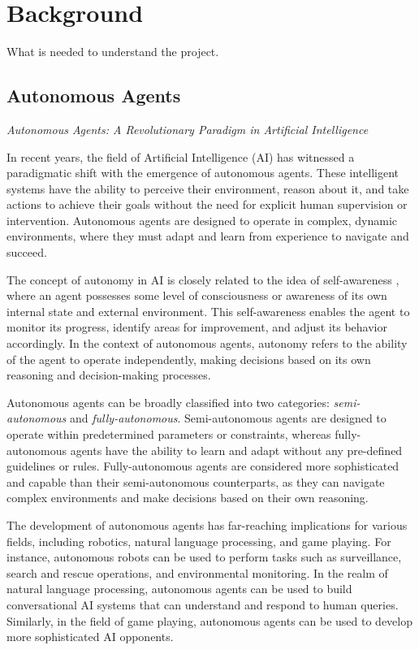 \chapter{Background}

What is needed to understand the project.

\section{Autonomous Agents}
\textit{Autonomous Agents: A Revolutionary Paradigm in Artificial Intelligence }

In recent years, the field of Artificial Intelligence (AI) has witnessed a paradigmatic
shift with the emergence of autonomous agents. These intelligent systems have
the ability to perceive their environment, reason about it, and take actions to
achieve their goals without the need for explicit human supervision or
intervention. Autonomous agents are designed to operate in complex, dynamic
environments, where they must adapt and learn from experience to navigate and succeed.

The concept of autonomy in AI is closely related to the idea of self-awareness ,
where an agent possesses some level of consciousness or awareness of its own internal
state and external environment. This self-awareness enables the agent to monitor
its progress, identify areas for improvement, and adjust its behavior
accordingly. In the context of autonomous agents, autonomy refers to the ability
of the agent to operate independently, making decisions based on its own reasoning
and decision-making processes.

Autonomous agents can be broadly classified into two categories: \textit{semi-autonomous}
and \textit{fully-autonomous}. Semi-autonomous agents are designed to operate within
predetermined parameters or constraints, whereas fully-autonomous agents have
the ability to learn and adapt without any pre-defined guidelines or rules. Fully-autonomous
agents are considered more sophisticated and capable than their semi-autonomous counterparts,
as they can navigate complex environments and make decisions based on their own
reasoning.

The development of autonomous agents has far-reaching implications for various
fields, including robotics, natural language processing, and game playing. For
instance, autonomous robots can be used to perform tasks such as surveillance,
search and rescue operations, and environmental monitoring. In the realm of
natural language processing, autonomous agents can be used to build conversational
AI systems that can understand and respond to human queries. Similarly, in the field
of game playing, autonomous agents can be used to develop more sophisticated AI
opponents.

